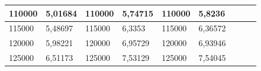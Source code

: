 \documentclass[11pt,openany]{book}
\begin{document}
\begin{table}[!ht]
\begin{tabular}{|l|l|l|l|l|l|l|l|}
        110000                                            & 5,01684                                            & 110000                                              & 5,74715                                             & 110000          & 5,8236          & ~               & ~               \\ \hline
        115000                                            & 5,48697                                            & 115000                                              & 6,3353                                              & 115000          & 6,36572         & ~               & ~               \\ \hline
        120000                                            & 5,98221                                            & 120000                                              & 6,95729                                             & 120000          & 6,93946         & ~               & ~               \\ \hline
        125000                                            & 6,51173                                            & 125000                                              & 7,53129                                             & 125000          & 7,54045         & ~               &                 \\\hline
    \end{tabular}
\end{table}
\end{document}
